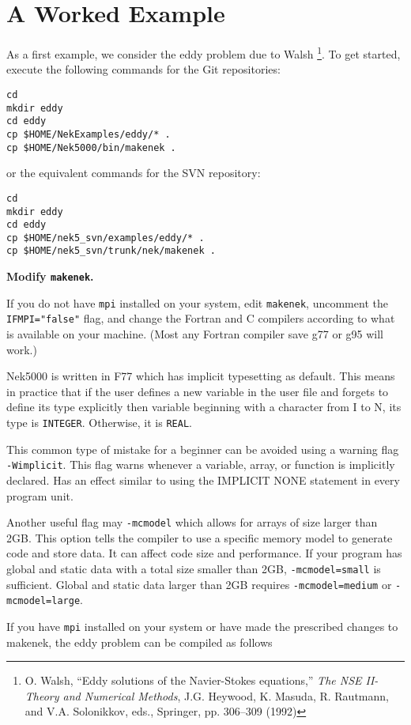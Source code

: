 \section{A Worked Example}
As a first example, we consider the eddy problem due to Walsh 
\footnote{O. Walsh, ``Eddy solutions of the Navier-Stokes equations,''
{\em The NSE II-Theory and Numerical Methods}, J.G. Heywood, K. Masuda, 
R. Rautmann, and V.A. Solonikkov, eds., Springer, pp.  306--309 (1992)}.
To get started, execute the following commands for the Git repositories:
\begin{verbatim}
cd
mkdir eddy
cd eddy
cp $HOME/NekExamples/eddy/* .
cp $HOME/Nek5000/bin/makenek .
\end{verbatim}
or the equivalent commands for the SVN repository:
\begin{verbatim}
cd
mkdir eddy
cd eddy
cp $HOME/nek5_svn/examples/eddy/* .
cp $HOME/nek5_svn/trunk/nek/makenek .
\end{verbatim}

{\bf Modify {\tt makenek}.}

If you do not have {\tt mpi} installed on your system, edit {\tt makenek},
uncomment the {\tt IFMPI="false"} flag, and change the Fortran and C
compilers according to what is available on your machine.  (Most any
Fortran compiler save g77 or g95 will work.)

Nek5000 is written in F77 which has implicit typesetting as default. This means in practice that if the user defines a new variable in the user file and forgets to define its type explicitly then variable beginning with a character from I to N, its type is {\tt INTEGER}. Otherwise, it is {\tt REAL}. 

This common type of mistake for a beginner can be avoided using a warning flag {\tt -Wimplicit}. This flag warns whenever a variable, array, or function is implicitly declared. Has an effect similar to using the IMPLICIT NONE statement in every program unit. 

Another useful flag may {\tt -mcmodel} which allows for arrays of size larger than 2GB. This option tells the compiler to use a specific memory model to generate code and store data. It can affect code size and performance. If your program has global and static data with a total size smaller than 2GB, {\tt -mcmodel=small} is sufficient. Global and static data larger than 2GB requires {\tt -mcmodel=medium} or {\tt -mcmodel=large}.


If you have {\tt mpi} installed on your system or have made the prescribed
changes to makenek, the eddy problem can be compiled as follows


